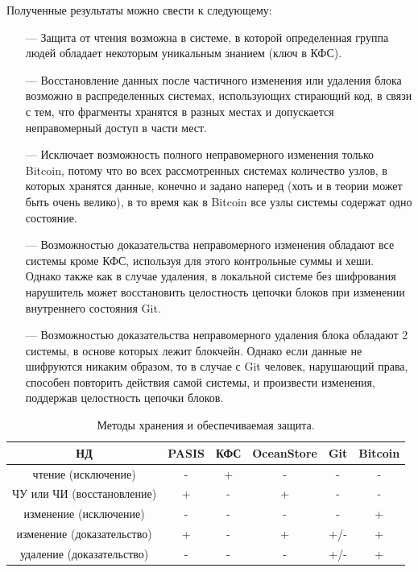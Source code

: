 Полученные результаты можно свести к следующему:
\begin{itemize}
    \item[---] Защита от чтения возможна в системе, в которой определенная группа людей обладает некоторым уникальным знанием (ключ в КФС).
    \item[---] Восстановление данных после частичного изменения или удаления блока возможно в распределенных системах, использующих стирающий код, в связи с тем, что фрагменты хранятся в разных местах и допускается неправомерный доступ в части мест.
    \item[---] Исключает возможность полного неправомерного изменения только Bitcoin, потому что во всех рассмотренных системах количество узлов, в которых хранятся данные, конечно и задано наперед (хоть и в теории может быть очень велико), в то время как в Bitcoin все узлы системы содержат одно состояние.
    \item[---] Возможностью доказательства неправомерного изменения обладают все системы кроме КФС, используя для этого контрольные суммы и хеши. Однако также как в случае удаления, в локальной системе без шифрования нарушитель может восстановить целостность цепочки блоков при изменении внутреннего состояния Git.
    \item[---] Возможностью доказательства неправомерного удаления блока обладают 2 системы, в основе которых лежит блокчейн. Однако если данные не шифруются никаким образом, то в случае с Git человек, нарушающий права, способен повторить действия самой системы, и произвести изменения, поддержав целостность цепочки блоков.
\end{itemize}

\begin{table}[h]
    \begin{center}
        \caption{Методы хранения и обеспечиваемая защита.}
        \label{tab:res}
        \begin{tabular}{|c|c|c|c|c|c|}
            \hline
            \bfseries НД & \bfseries PASIS & \bfseries КФС & \bfseries OceanStore & \bfseries Git & \bfseries Bitcoin  \\
            \hline
            чтение (исключение) & - & + & - & - & - \\ \hline
            ЧУ или ЧИ (восстановление) & + & - & + & - & - \\ \hline
            изменение (исключение) & - & - & - & - & + \\ \hline
            изменение (доказательство) & + & - & + & +/- & + \\ \hline
            удаление (доказательство) & - & - & - & +/- & + \\ \hline
        \end{tabular}
    \end{center}
\end{table}

